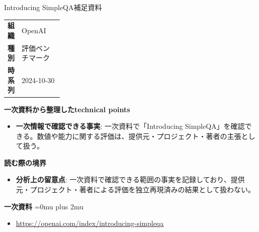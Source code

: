\begin{technicalnote}{Introducing SimpleQA}{補足資料}
\begingroup
\begin{tabularx}{\linewidth}{@{}>{\bfseries}p{0.22\linewidth}X@{}}
組織 & OpenAI \\
種別 & 評価ベンチマーク \\
時系列 & 2024-10-30 \\
\end{tabularx}
\smallskip
{\bfseries 一次資料から整理したtechnical points}
\begin{itemize}[leftmargin=1.5em,itemsep=0.35em]
\item \textbf{一次情報で確認できる事実}: 一次資料で「Introducing SimpleQA」を確認できる。数値や能力に関する評価は、提供元・プロジェクト・著者の主張として扱う。
\end{itemize}
\begin{minipage}{\linewidth}
{\bfseries 読む際の境界}
\begin{itemize}[leftmargin=1.5em,itemsep=0.35em]
\item \textbf{分析上の留意点}: 一次資料で確認できる範囲の事実を記録しており、提供元・プロジェクト・著者による評価を独立再現済みの結果として扱わない。
\end{itemize}
\begin{samepage}
{\bfseries 一次資料}
\begingroup\sloppy
\Urlmuskip=0mu plus 2mu\relax
\begin{itemize}[leftmargin=1.5em,itemsep=0.25em]
\item {\scriptsize\url{https://openai.com/index/introducing-simpleqa}}
\end{itemize}
\endgroup
\end{samepage}
\end{minipage}
\endgroup
\end{technicalnote}
\medskip
